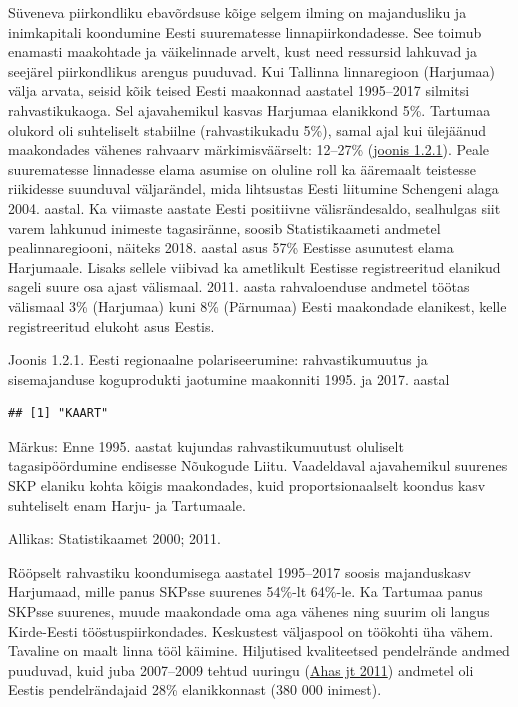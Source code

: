 \documentclass[estonian,]{article}
\begin{document}
Süveneva piirkondliku ebavõrdsuse kõige selgem ilming on majandusliku ja inimkapitali koondumine Eesti suurematesse linnapiirkondadesse. See toimub enamasti maakohtade ja väikelinnade arvelt, kust need ressursid lahkuvad ja seejärel piirkondlikus arengus puuduvad. Kui Tallinna linnaregioon (Harjumaa) välja arvata, seisid kõik teised Eesti maakonnad aastatel 1995--2017 silmitsi rahvastikukaoga. Sel ajavahemikul kasvas Harjumaa elanikkond 5\%. Tartumaa olukord oli suhteliselt stabiilne (rahvastikukadu 5\%), samal ajal kui ülejäänud maakondades vähenes rahvaarv märkimisväärselt: 12--27\% (\protect\hyperlink{figure121}{joonis 1.2.1}). Peale suurematesse linnadesse elama asumise on oluline roll ka ääremaalt teistesse riikidesse suunduval väljarändel, mida lihtsustas Eesti liitumine Schengeni alaga 2004. aastal. Ka viimaste aastate Eesti positiivne välisrändesaldo, sealhulgas siit varem lahkunud inimeste tagasiränne, soosib Statistikaameti andmetel pealinnaregiooni, näiteks 2018. aastal asus 57\% Eestisse asunutest elama Harjumaale. Lisaks sellele viibivad ka ametlikult Eestisse registreeritud elanikud sageli suure osa ajast välismaal. 2011. aasta rahvaloenduse andmetel töötas välismaal 3\% (Harjumaa) kuni 8\% (Pärnumaa) Eesti maakondade elanikest, kelle registreeritud elukoht asus Eestis.

{Joonis 1.2.1.} Eesti regionaalne polariseerumine: rahvastikumuutus ja sisemajanduse koguprodukti jaotumine maakonniti 1995. ja 2017. aastal

\begin{verbatim}
## [1] "KAART"
\end{verbatim}

\begin{figure-comment}
{Märkus:} Enne 1995. aastat kujundas rahvastikumuutust oluliselt
tagasipöördumine endisesse Nõukogude Liitu. Vaadeldaval ajavahemikul
suurenes SKP elaniku kohta kõigis maakondades, kuid proportsionaalselt
koondus kasv suhteliselt enam Harju- ja Tartumaale.
\end{figure-comment}

\begin{imgsource}
{Allikas:} Statistikaamet 2000; 2011.
\end{imgsource}

Rööpselt rahvastiku koondumisega aastatel 1995--2017 soosis majanduskasv Harjumaad, mille panus SKPsse suurenes 54\%-lt 64\%-le. Ka Tartumaa panus SKPsse suurenes, muude maakondade oma aga vähenes ning suurim oli langus Kirde-Eesti tööstuspiirkondades. Keskustest väljaspool on töökohti üha vähem. Tavaline on maalt linna tööl käimine. Hiljutised kvaliteetsed pendelrände andmed puuduvad, kuid juba 2007--2009 tehtud uuringu (\protect\hyperlink{Ahas2011}{Ahas jt 2011}) andmetel oli Eestis pendelrändajaid 28\% elanikkonnast (380 000 inimest).
\end{document}
